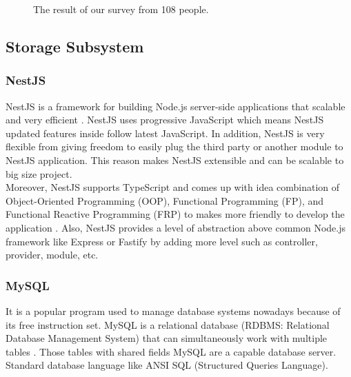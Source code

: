 \documentclass[12pt,oneside,openright,a4paper]{cpe-english-project}
\begin{document}
\begin{figure}[h!]
  \centering
  \setlength{\fboxrule}{0.2mm}
  \setlength{\fboxsep}{0.5cm}
  \caption{The result of our survey from 108 people.}
  \label{fig:ch3_result_survey}
\end{figure}

\subsection{ Storage Subsystem}
\subsubsection{NestJS}
NestJS is a framework for building Node.js server-side applications that scalable and very
efficient \cite{nestjs_beautiful}. NestJS uses progressive JavaScript which means NestJS updated
features inside follow latest JavaScript. In addition, NestJS is very flexible from giving
freedom to easily plug the third party or another module to NestJS application. This reason
makes NestJS extensible and can be scalable to big size project.\\
Moreover, NestJS supports TypeScript and comes up with idea combination of Object-Oriented
Programming (OOP), Functional Programming (FP), and Functional Reactive Programming (FRP)
to makes more friendly to develop the application \cite{nestjs_beautiful}. Also, NestJS
provides a level of abstraction above common Node.js framework like Express or
Fastify by adding more level such as controller, provider, module, etc.

\subsubsection{MySQL}
It is a popular program used to manage database systems nowadays because of its free instruction
set. MySQL is a relational database (RDBMS: Relational Database Management System) that can
simultaneously work with multiple tables \cite{what_is_mysql}. Those tables with shared fields
MySQL are a capable database server. Standard database language like ANSI SQL
(Structured Queries Language).
\end{document}
